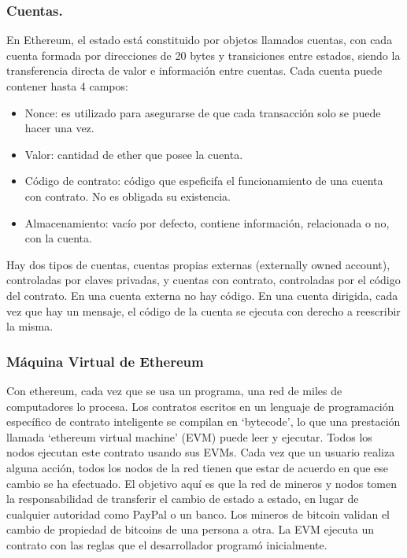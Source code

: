 \documentclass[11pt,a4paper]{article}
\begin{document}
\subsubsection{Cuentas.}
En Ethereum, el estado está constituido por objetos llamados cuentas, con cada cuenta formada por direcciones de 20 bytes y transiciones entre estados, siendo la transferencia directa de valor e información entre cuentas. Cada cuenta puede contener hasta 4 campos:
\begin{itemize}
	\item Nonce: es utilizado para asegurarse de que cada transacción solo se puede hacer una vez.
	\item Valor: cantidad de ether que posee la cuenta.
	\item Código de contrato: código que espeficifa el funcionamiento de una cuenta con contrato. No es obligada su existencia.
	\item Almacenamiento: vacío por defecto, contiene información, relacionada o no, con la cuenta.
\end{itemize}
Hay dos tipos de cuentas, cuentas propias externas (externally owned account), controladas por claves privadas, y cuentas con contrato, controladas por el código del contrato. En una cuenta externa no hay código. En una cuenta dirigida, cada vez que hay un mensaje, el código de la cuenta se ejecuta con derecho a reescribir la misma.

\subsubsection{Máquina Virtual de Ethereum}
Con ethereum, cada vez que se usa un programa, una red de miles de computadores lo procesa. Los contratos escritos en un lenguaje de programación específico de contrato inteligente se compilan en ‘bytecode’, lo que una prestación llamada ‘ethereum virtual machine’ (EVM) puede leer y ejecutar. Todos los nodos ejecutan este contrato usando sus EVMs.  Cada vez que un usuario realiza alguna acción, todos los nodos de la red tienen que estar de acuerdo en que ese cambio se ha efectuado.
El objetivo aquí es que la red de mineros y nodos tomen la responsabilidad de transferir el cambio de estado a estado, en lugar de cualquier autoridad como PayPal o un banco. Los mineros de bitcoin validan el cambio de propiedad de bitcoins de una persona a otra. La EVM ejecuta un  contrato con las reglas que el desarrollador programó inicialmente. \\
\end{document}
